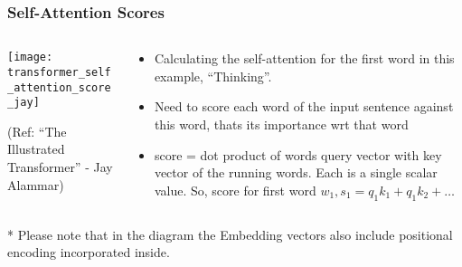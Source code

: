 \begin{frame}[fragile]\frametitle{Self-Attention Scores}

\begin{columns}
    \begin{column}[T]{0.5\linewidth}
\begin{center}
\texttt{[image: transformer\_self\_attention\_score\_jay]}


{\tiny (Ref: ``The Illustrated Transformer'' - Jay Alammar)}
\end{center}		

		\end{column}
    \begin{column}[T]{0.5\linewidth}

\begin{itemize}
\item Calculating the self-attention for the first word in this example, ``Thinking''. 
\item Need to score each word of the input sentence against this word, thats its importance wrt that word
\item score = dot product of words query vector with key vector of the running words. Each is a single scalar value. So, score for first word $w_1, s_1 = q_1 k_1 + q_1 k_2 + \ldots$
\end{itemize}
    \end{column}
  \end{columns}

* Please note that in the diagram the Embedding vectors also include positional encoding incorporated inside.
\end{frame}

